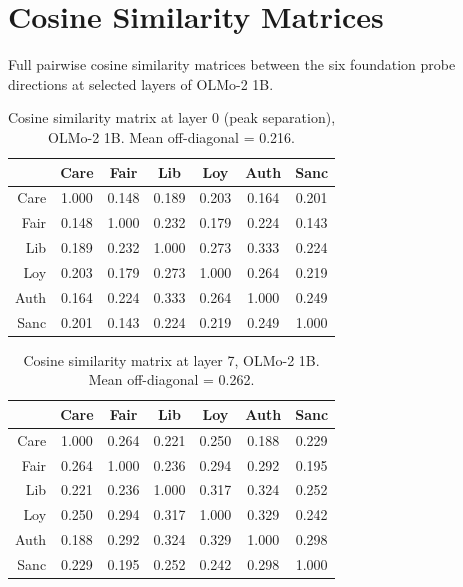\section{Cosine Similarity Matrices}\label{cosine-similarity-matrices}

\label{app:cosine}

Full pairwise cosine similarity matrices between the six foundation
probe directions at selected layers of OLMo-2 1B.

\begin{table}[h]
\centering
\caption{Cosine similarity matrix at layer 0 (peak separation), OLMo-2 1B. Mean off-diagonal = 0.216.}
\label{tab:cosine_l0}
\small
\begin{tabular}{r cccccc}
\toprule
     & Care & Fair & Lib & Loy & Auth & Sanc \\
\midrule
Care & 1.000 & 0.148 & 0.189 & 0.203 & 0.164 & 0.201 \\
Fair & 0.148 & 1.000 & 0.232 & 0.179 & 0.224 & 0.143 \\
Lib  & 0.189 & 0.232 & 1.000 & 0.273 & 0.333 & 0.224 \\
Loy  & 0.203 & 0.179 & 0.273 & 1.000 & 0.264 & 0.219 \\
Auth & 0.164 & 0.224 & 0.333 & 0.264 & 1.000 & 0.249 \\
Sanc & 0.201 & 0.143 & 0.224 & 0.219 & 0.249 & 1.000 \\
\bottomrule
\end{tabular}
\end{table}

\begin{table}[h]
\centering
\caption{Cosine similarity matrix at layer 7, OLMo-2 1B. Mean off-diagonal = 0.262.}
\label{tab:cosine_l7}
\small
\begin{tabular}{r cccccc}
\toprule
     & Care & Fair & Lib & Loy & Auth & Sanc \\
\midrule
Care & 1.000 & 0.264 & 0.221 & 0.250 & 0.188 & 0.229 \\
Fair & 0.264 & 1.000 & 0.236 & 0.294 & 0.292 & 0.195 \\
Lib  & 0.221 & 0.236 & 1.000 & 0.317 & 0.324 & 0.252 \\
Loy  & 0.250 & 0.294 & 0.317 & 1.000 & 0.329 & 0.242 \\
Auth & 0.188 & 0.292 & 0.324 & 0.329 & 1.000 & 0.298 \\
Sanc & 0.229 & 0.195 & 0.252 & 0.242 & 0.298 & 1.000 \\
\bottomrule
\end{tabular}
\end{table}

